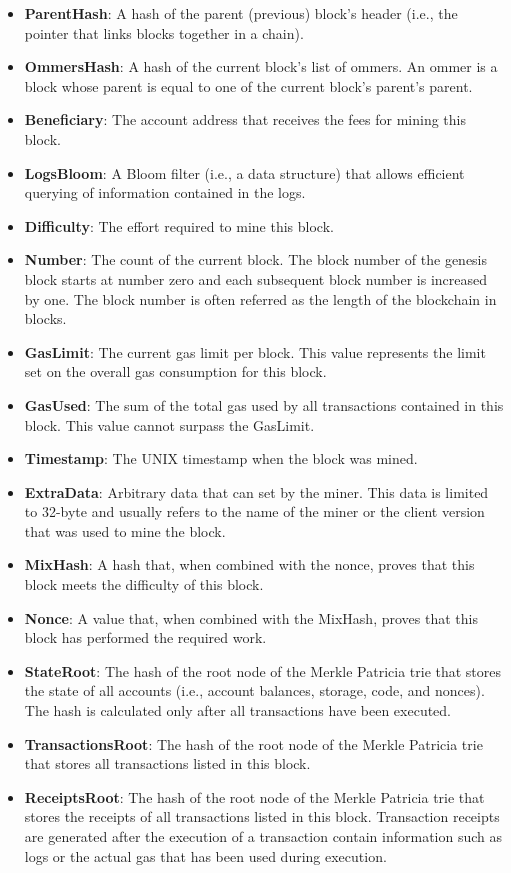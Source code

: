        \begin{itemize}
            \item \textbf{ParentHash}: A hash of the parent (previous) block's header (i.e., the pointer that links blocks together in a chain).
            \item \textbf{OmmersHash}: A hash of the current block's list of ommers. An ommer is a block whose parent is equal to one of the current block's parent's parent.
            \item \textbf{Beneficiary}: The account address that receives the fees for mining this block.
            \item \textbf{LogsBloom}: A Bloom filter (i.e., a data structure) that allows efficient querying of information contained in the logs.
            \item \textbf{Difficulty}: The effort required to mine this block.
            \item \textbf{Number}: The count of the current block. The block number of the genesis block starts at number zero and each subsequent block number is increased by one.
                The block number is often referred as the length of the blockchain in blocks.
            \item \textbf{GasLimit}: The current gas limit per block. This value represents the limit set on the overall gas consumption for this block.
            \item \textbf{GasUsed}: The sum of the total gas used by all transactions contained in this block. This value cannot surpass the GasLimit.
            \item \textbf{Timestamp}: The UNIX timestamp when the block was mined.
            \item \textbf{ExtraData}: Arbitrary data that can set by the miner. This data is limited to 32-byte and usually refers to the name of the miner or the client version that was used to mine the block.
            \item \textbf{MixHash}: A hash that, when combined with the nonce, proves that this block meets the difficulty of this block.
            \item \textbf{Nonce}: A value that, when combined with the MixHash, proves that this block has performed the required work.
            \item \textbf{StateRoot}: The hash of the root node of the Merkle Patricia trie that stores the state of all accounts (i.e., account balances, storage, code, and nonces).  The hash is calculated only after all transactions have been executed.
            \item \textbf{TransactionsRoot}: The hash of the root node of the Merkle Patricia trie that stores all transactions listed in this block.
            \item \textbf{ReceiptsRoot}: The hash of the root node of the Merkle Patricia trie that stores the receipts of all transactions listed in this block.
                Transaction receipts are generated after the execution of a transaction contain information such as logs or the actual gas that has been used during execution.

        \end{itemize}

